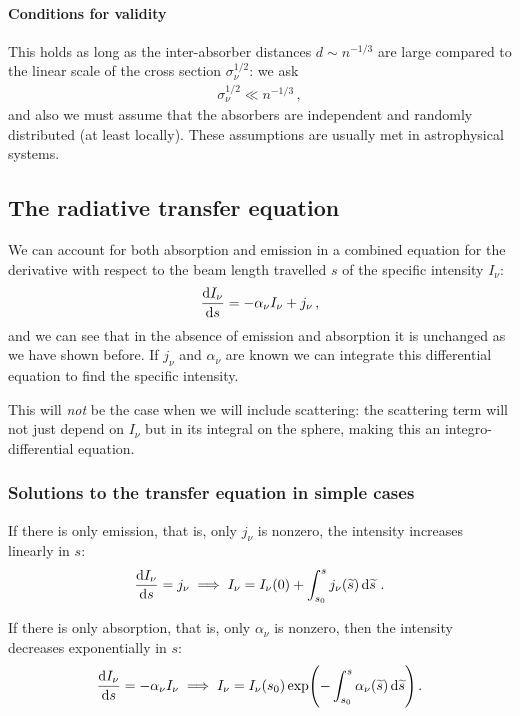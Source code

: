 \documentclass[main.tex]{subfiles}
\begin{document}
\paragraph{Conditions for validity}

This holds as long as the inter-absorber distances \(d \sim n^{-1/3}\) are large compared to the linear scale of the cross section \(\sigma_{\nu }^{1/2}\): we ask 
%
\begin{align}
\sigma_{\nu }^{1/2} \ll n^{-1/3}
\,,
\end{align}
%
and also we must assume that the absorbers are independent and randomly distributed (at least locally).
These assumptions are usually met in astrophysical systems. 

\subsection{The radiative transfer equation}

We can account for both absorption and emission in a combined equation for the derivative with respect to the beam length travelled \(s\) of the specific intensity \(I_{\nu }\): 
%
\begin{align}
\dv{I_{\nu }}{s} = - \alpha_{\nu } I_{\nu } + j_{\nu }
\,,
\end{align}
%
and we can see that in the absence of emission and absorption it is unchanged as we have shown before.
If \(j_{\nu }\) and \(\alpha_{\nu }\) are known we can integrate this differential equation to find the specific intensity. 

This will \emph{not} be the case when we will include scattering: the scattering term will not just depend on \(I_{\nu }\) but in its integral on the sphere, making this an integro-differential equation. 

\subsubsection{Solutions to the transfer equation in simple cases}

If there is only emission, that is, only \(j_{\nu }\) is nonzero, the intensity increases linearly in \(s\): 
%
\begin{align}
\dv{I_{\nu }}{s} = j_{\nu } \implies 
I_{\nu } = I_{\nu }(0) + \int_{s_0 }^{s} j_{\nu } (\widetilde{s}) \dd{\widetilde{s}} 
\,.
\end{align}

If there is only absorption, that is, only \(\alpha_{\nu }\) is nonzero, then the intensity decreases exponentially in \(s\):
%
\begin{align}
\dv{I_{\nu }}{s} = - \alpha_{\nu } I_{\nu } \implies 
I_{\nu } = I_{\nu }(s_0 ) \exp(- \int_{s_0 }^{s} \alpha_{\nu }(\widetilde{s}) \dd{\widetilde{s}})
\,.
\end{align}
\end{document}
